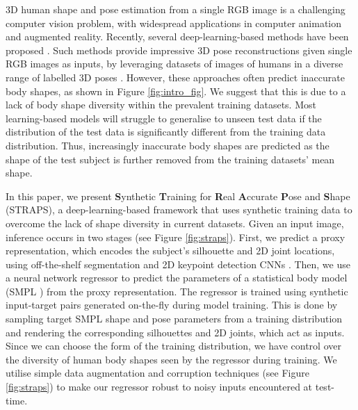 \documentclass{bmvc2k}
\begin{document}
3D human shape and pose estimation from a single RGB image is a challenging computer vision problem, with widespread applications in computer animation and augmented reality. Recently, several deep-learning-based methods have been proposed \cite{tan2017, pavlakos2018humanshape, hmrKanazawa17, omran2018nbf, kolotouros2019spin, kolotouros2019cmr, zhang2019danet, varol18_bodynet, Xu_2019_ICCV}. Such methods provide impressive 3D pose reconstructions given single RGB images as inputs, by leveraging datasets of images of humans in a diverse range of labelled 3D poses \cite{h36m_pami, varol17_surreal, vonMarcard2018, movi2020, Lassner:UP:2017, mono-3dhp2017}. However, these approaches often predict inaccurate body shapes, as shown in Figure \ref{fig:intro_fig}. We suggest that this is due to a lack of body shape diversity within the prevalent training datasets. Most learning-based models will struggle to generalise to unseen test data if the distribution of the test data is significantly different from the training data distribution. Thus, increasingly inaccurate body shapes are predicted as the shape of the test subject is further removed from the training datasets' mean shape.

In this paper, we present \textbf{S}ynthetic \textbf{T}raining for \textbf{R}eal \textbf{A}ccurate \textbf{P}ose and \textbf{S}hape (STRAPS), a deep-learning-based framework that uses synthetic training data to overcome the lack of shape diversity in current datasets. Given an input image, inference occurs in two stages (see Figure \ref{fig:straps}). First, we predict a proxy representation, which encodes the subject's silhouette and 2D joint locations, using off-the-shelf segmentation and 2D keypoint detection CNNs \cite{wu2019detectron2, he2017maskrcnn, Guler2018DensePose}. Then, we use a neural network regressor to predict the parameters of a statistical body model (SMPL \cite{SMPL:2015}) from the proxy representation. The regressor is trained using synthetic input-target pairs generated on-the-fly during model training. This is done by sampling target SMPL shape and pose parameters from a training distribution and rendering the corresponding silhouettes and 2D joints, which act as inputs. Since we can choose the form of the training distribution, we have control over the diversity of human body shapes seen by the regressor during training. We utilise simple data augmentation and corruption techniques (see Figure \ref{fig:straps}) to make our regressor robust to noisy inputs encountered at test-time.
\end{document}
